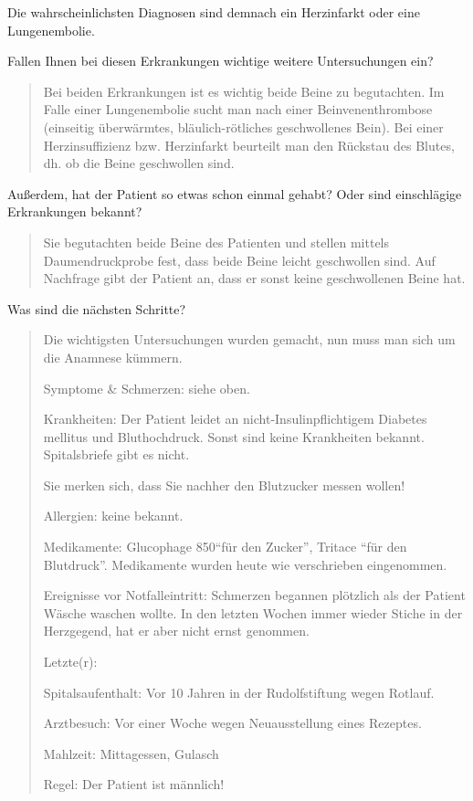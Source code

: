 Die wahrscheinlichsten Diagnosen sind demnach ein
Herzinfarkt oder eine Lungenembolie.

\noindent Fallen Ihnen bei diesen Erkrankungen wichtige
weitere Untersuchungen ein?

\begin{quote}
  Bei beiden Erkrankungen ist es
  wichtig beide Beine zu begutachten. Im Falle einer Lungenembolie sucht man nach
  einer Beinvenenthrombose (einseitig überwärmtes, bläulich-rötliches geschwollenes
  Bein). Bei einer Herzinsuffizienz bzw. Herzinfarkt beurteilt man den Rückstau des
  Blutes, dh. ob die Beine geschwollen sind.
\end{quote}


\noindent Außerdem, hat der Patient so etwas schon einmal
gehabt? Oder sind einschlägige Erkrankungen bekannt?  

\begin{quote}
  Sie begutachten beide Beine des Patienten und stellen mittels
  Daumendruckprobe fest, dass beide Beine leicht geschwollen sind. Auf
  Nachfrage gibt der Patient an, dass er sonst keine geschwollenen Beine
  hat.
\end{quote}

\noindent Was sind die nächsten Schritte?

\begin{quote}
  Die wichtigsten Untersuchungen wurden gemacht, nun muss man sich um die
  Anamnese kümmern.
  
  Symptome \& Schmerzen: siehe oben.
  
  Krankheiten: Der Patient leidet an nicht-Insulinpflichtigem Diabetes
  mellitus und Bluthochdruck. Sonst sind keine Krankheiten bekannt.
  Spitalsbriefe gibt es nicht.
  
  Sie merken sich, dass Sie nachher den Blutzucker messen wollen!
  
  Allergien: keine bekannt.
  
  Medikamente: Glucophage 850\Mg* \enquote{für den Zucker},
  Tritace \enquote{für den Blutdruck}. Medikamente wurden heute wie verschrieben eingenommen.
  
  Ereignisse vor Notfalleintritt: Schmerzen begannen plötzlich als der
  Patient Wäsche waschen wollte. In den letzten Wochen immer wieder
  Stiche in der Herzgegend, hat er aber nicht ernst genommen.
  
  Letzte(r):
  
  Spitalsaufenthalt: Vor 10 Jahren in der Rudolfstiftung wegen Rotlauf.
  
  Arztbesuch: Vor einer Woche wegen Neuausstellung eines Rezeptes.
  
  Mahlzeit: Mittagessen, Gulasch
  
  Regel: Der Patient ist männlich!
\end{quote}
% 

